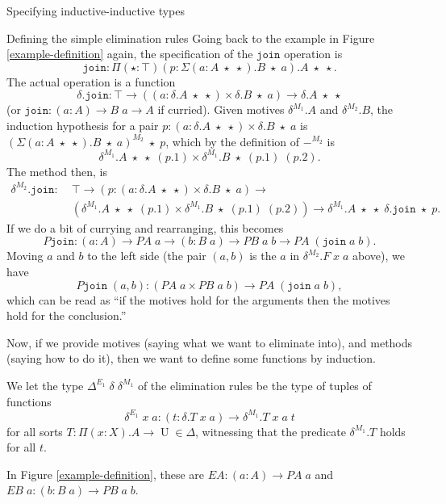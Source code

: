\documentclass[runningheads]{llncs}
\DeclareMathOperator{\UU}{U}
\newcommand{\join}{\texttt{join}}
\begin{document}
{\begin{section}{Specifying inductive-inductive types}
\begin{subsection}{\label{simple-elim-section}Defining the simple elimination rules}
Going back to the example in Figure \ref{example-definition} again, the specification of the $\join$ operation is \[\join : \Pi(\star : \top)(p : \Sigma(a : A\;\star\;\star).B\;\star\;a).A\;\star\;\star.\]
The actual operation is a function \[\delta.\join : \top \to ((a : \delta.A\;\star\;\star)\times \delta.B\;\star\;a) \to \delta.A\;\star\;\star\] (or $\join : (a : A) \to B\;a \to A$ if curried).
Given motives $\delta^{M_1}.A$ and $\delta^{M_2}.B$, the induction hypothesis for a pair $p : (a : \delta.A\;\star\;\star)\times \delta.B\;\star\;a$ is $(\Sigma(a : A\;\star\;\star).B\;\star\;a)^{M_2}\;\star\;p$, which by the definition of $-^{M_2}$ is \[\delta^{M_1}.A\;\star\;\star\;(p.1) \times \delta^{M_1}.B\;\star\;(p.1)\;(p.2).\] The method then, is \begin{align*}\delta^{M_2}.\join :&\; \top \to (p : (a : \delta.A\;\star\;\star)\times \delta.B\;\star\;a) \to\\&\; (\delta^{M_1}.A\;\star\;\star\;(p.1) \times \delta^{M_1}.B\;\star\;(p.1)\;(p.2)) \to \delta^{M_1}.A\;\star\;\star\;\delta.\join\;\star\;p.\end{align*} If we do a bit of currying and rearranging, this becomes \[P\join : (a : A) \to PA\;a \to (b : B\;a) \to PB\;a\;b \to PA\;(\join\;a\;b).\] Moving $a$ and $b$ to the left side (the pair $(a, b)$ is the $a$ in $\delta^{M_2}.F\;x\;a$ above), we have \[P\join\;(a, b) : (PA\;a \times PB\;a\;b) \to PA\;(\join\;a\;b),\] which can be read as ``if the motives hold for the arguments then the motives hold for the conclusion.''

Now, if we provide motives (saying what we want to eliminate into), and methods (saying how to do it), then we want to define some functions by induction.

\begin{definition}
We let the type $\Delta^{E_1}\;\delta\;\delta^{M_1}$ of the elimination rules be the type of tuples of functions \[\delta^{E_1} \;x\;a : (t : \delta.T\;x\;a) \to \delta^{M_1}.T\;x\;a\;t \] for all sorts $T : \Pi(x : X).A\to\UU \in\Delta$, witnessing that the predicate $\delta^{M_1}.T$ holds for all $t$.
\end{definition}

In Figure \ref{example-definition}, these are $EA : (a : A) \to PA\;a$ and $EB\;a : (b : B\;a) \to PB\;a\;b$.


\end{subsection}
\end{section}}
\end{document}
